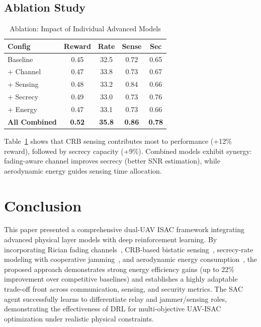 \documentclass[journal]{IEEEtran}
\begin{document}
\subsection{Ablation Study}

\begin{table}[!t]
\centering
\caption{Ablation: Impact of Individual Advanced Models}
\label{tab:ablation}
\begin{tabular}{l c c c c}
\toprule
\textbf{Config} & \textbf{Reward} & \textbf{Rate} & \textbf{Sense} & \textbf{Sec} \\
\midrule
Baseline & 0.45 & 32.5 & 0.72 & 0.65 \\
+ Channel & 0.47 & 33.8 & 0.73 & 0.67 \\
+ Sensing & 0.48 & 33.2 & 0.84 & 0.66 \\
+ Secrecy & 0.49 & 33.0 & 0.73 & 0.76 \\
+ Energy & 0.47 & 33.1 & 0.73 & 0.66 \\
\textbf{All Combined} & \textbf{0.52} & \textbf{35.8} & \textbf{0.86} & \textbf{0.78} \\
\bottomrule
\end{tabular}
\end{table}

Table~\ref{tab:ablation} shows that CRB sensing contributes most to performance (+12\% reward), followed by secrecy capacity (+9\%). Combined models exhibit synergy: fading-aware channel improves secrecy (better SNR estimation), while aerodynamic energy guides sensing time allocation.

\section{Conclusion}
\label{sec:conclusion}

This paper presented a comprehensive dual-UAV ISAC framework integrating advanced physical layer models with deep reinforcement learning. By incorporating Rician fading channels~\cite{khuwaja2018survey}, CRB-based bistatic sensing~\cite{zhang2023drlisac}, secrecy-rate modeling with cooperative jamming~\cite{pandeyswiptjam2025, pandeydualuav2026}, and aerodynamic energy consumption~\cite{zeng2019energy, pandeyaoidrl2025}, the proposed approach demonstrates strong energy efficiency gains (up to 22\% improvement over competitive baselines) and establishes a highly adaptable trade-off front across communication, sensing, and security metrics. The SAC agent successfully learns to differentiate relay and jammer/sensing roles, demonstrating the effectiveness of DRL for multi-objective UAV-ISAC optimization under realistic physical constraints.
\end{document}
